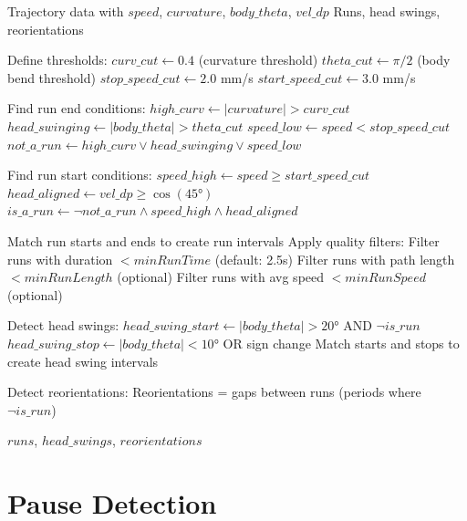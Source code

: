 \documentclass[
  11pt,
]{article}
\begin{document}
\begin{algorithm}[H]
\caption{MAGAT Track Segmentation}
\label{alg:magat-segmentation}
\begin{algorithmic}[1]
\REQUIRE Trajectory data with $speed$, $curvature$, $body\_theta$, $vel\_dp$
\ENSURE Runs, head swings, reorientations

\STATE Define thresholds:
\STATE \quad $curv\_cut \leftarrow 0.4$ (curvature threshold)
\STATE \quad $theta\_cut \leftarrow \pi/2$ (body bend threshold)
\STATE \quad $stop\_speed\_cut \leftarrow 2.0$ mm/s
\STATE \quad $start\_speed\_cut \leftarrow 3.0$ mm/s

\STATE Find run end conditions:
\STATE \quad $high\_curv \leftarrow |curvature| > curv\_cut$
\STATE \quad $head\_swinging \leftarrow |body\_theta| > theta\_cut$
\STATE \quad $speed\_low \leftarrow speed < stop\_speed\_cut$
\STATE \quad $not\_a\_run \leftarrow high\_curv \vee head\_swinging \vee speed\_low$

\STATE Find run start conditions:
\STATE \quad $speed\_high \leftarrow speed \geq start\_speed\_cut$
\STATE \quad $head\_aligned \leftarrow vel\_dp \geq \cos(45°)$
\STATE \quad $is\_a\_run \leftarrow \neg not\_a\_run \wedge speed\_high \wedge head\_aligned$

\STATE Match run starts and ends to create run intervals
\STATE Apply quality filters:
\STATE \quad Filter runs with duration $< minRunTime$ (default: 2.5s)
\STATE \quad Filter runs with path length $< minRunLength$ (optional)
\STATE \quad Filter runs with avg speed $< minRunSpeed$ (optional)

\STATE Detect head swings:
\STATE \quad $head\_swing\_start \leftarrow |body\_theta| > 20°$ AND $\neg is\_run$
\STATE \quad $head\_swing\_stop \leftarrow |body\_theta| < 10°$ OR sign change
\STATE \quad Match starts and stops to create head swing intervals

\STATE Detect reorientations:
\STATE \quad Reorientations = gaps between runs (periods where $\neg is\_run$)

\RETURN $runs$, $head\_swings$, $reorientations$
\end{algorithmic}
\end{algorithm}

\hypertarget{pause-detection}{%
\section{Pause Detection}\label{pause-detection}}
\end{document}
